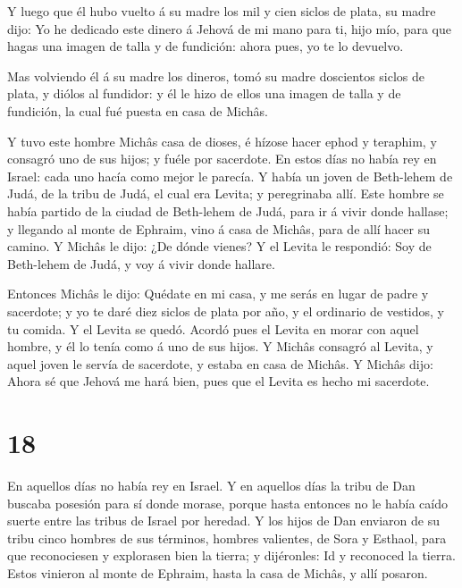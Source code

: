  Y luego que él hubo vuelto á su madre los mil y cien siclos
de plata, su madre dijo: Yo he dedicado este dinero á Jehová de mi mano
para ti, hijo mío, para que hagas una imagen de talla y de fundición:
ahora pues, yo te lo devuelvo.

 Mas volviendo él á su madre los dineros, tomó su madre
doscientos siclos de plata, y diólos al fundidor: y él le hizo de ellos
una imagen de talla y de fundición, la cual fué puesta en casa de
Michâs.

 Y tuvo este hombre Michâs casa de dioses, é hízose hacer
ephod y teraphim, y consagró uno de sus hijos; y fuéle por sacerdote.
 En estos días no había rey en Israel: cada uno hacía como
mejor le parecía.  Y había un joven de Beth-lehem de Judá,
de la tribu de Judá, el cual era Levita; y peregrinaba allí.
 Este hombre se había partido de la ciudad de Beth-lehem de
Judá, para ir á vivir donde hallase; y llegando al monte de Ephraim,
vino á casa de Michâs, para de allí hacer su camino.  Y
Michâs le dijo: ¿De dónde vienes? Y el Levita le respondió: Soy de
Beth-lehem de Judá, y voy á vivir donde hallare.

 Entonces Michâs le dijo: Quédate en mi casa, y me serás en
lugar de padre y sacerdote; y yo te daré diez siclos de plata por año, y
el ordinario de vestidos, y tu comida. Y el Levita se quedó.
 Acordó pues el Levita en morar con aquel hombre, y él lo
tenía como á uno de sus hijos.  Y Michâs consagró al
Levita, y aquel joven le servía de sacerdote, y estaba en casa de
Michâs.  Y Michâs dijo: Ahora sé que Jehová me hará bien,
pues que el Levita es hecho mi sacerdote.

\hypertarget{section-17}{%
\section{18}\label{section-17}}

 En aquellos días no había rey en Israel. Y en aquellos días
la tribu de Dan buscaba posesión para sí donde morase, porque hasta
entonces no le había caído suerte entre las tribus de Israel por
heredad.  Y los hijos de Dan enviaron de su tribu cinco
hombres de sus términos, hombres valientes, de Sora y Esthaol, para que
reconociesen y explorasen bien la tierra; y dijéronles: Id y reconoced
la tierra. Estos vinieron al monte de Ephraim, hasta la casa de Michâs,
y allí posaron.

